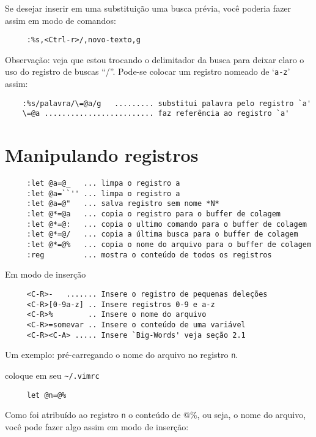 Se desejar inserir em uma substituição uma busca prévia, você poderia
fazer assim em modo de comandos:

\begin{verbatim}
     :%s,<Ctrl-r>/,novo-texto,g
\end{verbatim}

Observação: veja que estou trocando o delimitador da busca para deixar
claro o uso do registro de buscas ``/''. {\Large {}} Pode-se colocar
um registro nomeado de `{\tt a-z}' assim:

\begin{verbatim}
    :%s/palavra/\=@a/g   ......... substitui palavra pelo registro `a'
    \=@a ......................... faz referência ao registro `a'
\end{verbatim}

\section{Manipulando registros}
\label{Manipulando registros}

\begin{verbatim}
     :let @a=@_   ... limpa o registro a
     :let @a=``'' ... limpa o registro a
     :let @a=@"   ... salva registro sem nome *N*
     :let @*=@a   ... copia o registro para o buffer de colagem
     :let @*=@:   ... copia o ultimo comando para o buffer de colagem
     :let @*=@/   ... copia a última busca para o buffer de colagem
     :let @*=@%   ... copia o nome do arquivo para o buffer de colagem
     :reg         ... mostra o conteúdo de todos os registros
\end{verbatim}

Em modo de inserção

\begin{verbatim}
     <C-R>-   ....... Insere o registro de pequenas deleções
     <C-R>[0-9a-z] .. Insere registros 0-9 e a-z
     <C-R>%        .. Insere o nome do arquivo
     <C-R>=somevar .. Insere o conteúdo de uma variável
     <C-R><C-A> ..... Insere `Big-Words' veja seção 2.1 
\end{verbatim}


Um exemplo: pré-carregando o nome do arquivo no registro \verb+n+.

coloque em seu \verb+~/.vimrc+

\begin{verbatim}
     let @n=@%
\end{verbatim}

Como foi atribuído ao registro \verb+n+ o conteúdo de @\%, ou seja, o nome
do arquivo, você pode fazer algo assim em modo de inserção:

